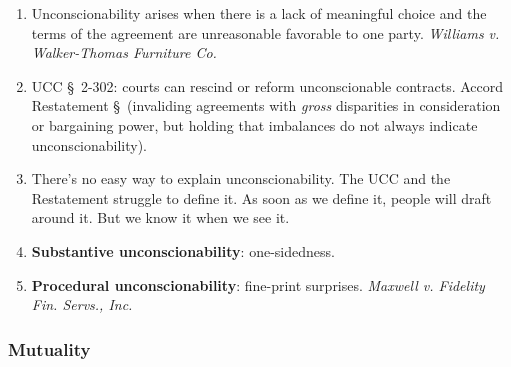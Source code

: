 \begin{enumerate}
    \item Unconscionability arises when there is a lack of meaningful choice 
    and the terms of the agreement are unreasonable favorable to one party. 
    \emph{Williams v. Walker-Thomas Furniture Co.}
    \item UCC \S\ 2-302: courts can rescind or reform unconscionable 
    contracts. Accord Restatement \S\ (invaliding agreements with \emph{gross} 
    disparities in consideration or bargaining power, but holding that 
    imbalances do not always indicate unconscionability).
    \item There's no easy way to explain unconscionability. The UCC and the 
    Restatement struggle to define it. As soon as we define it, people will 
    draft around it. But we know it when we see it.
    \item \textbf{Substantive unconscionability}: one-sidedness.
    \item \textbf{Procedural unconscionability}: fine-print surprises.  
    \emph{Maxwell v. Fidelity Fin. Servs., Inc.}
\end{enumerate}

\subsubsection{Mutuality}

